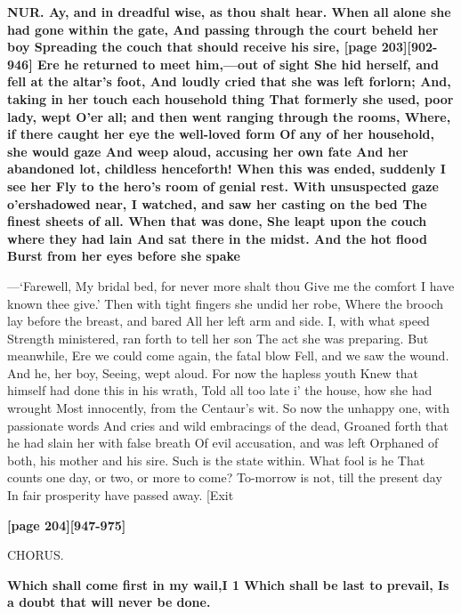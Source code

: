 \documentclass[11pt,letter]{book}
\begin{document}
\par \textbf{NUR. Ay, and in dreadful wise, as thou shalt hear. When all alone she had gone within the gate, And passing through the court beheld her boy Spreading the couch that should receive his sire, [page 203][902-946] Ere he returned to meet him,—out of sight She hid herself, and fell at the altar’s foot, And loudly cried that she was left forlorn; And, taking in her touch each household thing That formerly she used, poor lady, wept O’er all; and then went ranging through the rooms, Where, if there caught her eye the well-loved form Of any of her household, she would gaze And weep aloud, accusing her own fate And her abandoned lot, childless henceforth! When this was ended, suddenly I see her Fly to the hero’s room of genial rest. With unsuspected gaze o’ershadowed near, I watched, and saw her casting on the bed The finest sheets of all. When that was done, She leapt upon the couch where they had lain And sat there in the midst. And the hot flood Burst from her eyes before she spake}
\par  —‘Farewell, My bridal bed, for never more shalt thou Give me the comfort I have known thee give.’ Then with tight fingers she undid her robe, Where the brooch lay before the breast, and bared All her left arm and side. I, with what speed Strength ministered, ran forth to tell her son The act she was preparing. But meanwhile, Ere we could come again, the fatal blow Fell, and we saw the wound. And he, her boy, Seeing, wept aloud. For now the hapless youth Knew that himself had done this in his wrath, Told all too late i’ the house, how she had wrought Most innocently, from the Centaur’s wit. So now the unhappy one, with passionate words And cries and wild embracings of the dead, Groaned forth that he had slain her with false breath Of evil accusation, and was left Orphaned of both, his mother and his sire. Such is the state within. What fool is he That counts one day, or two, or more to come? To-morrow is not, till the present day In fair prosperity have passed away. [Exit

\par \textbf{[page 204][947-975]}
\par 

\par  CHORUS.

\par \textbf{Which shall come first in my wail,I 1 Which shall be last to prevail, Is a doubt that will never be done.}
\par 
\end{document}
